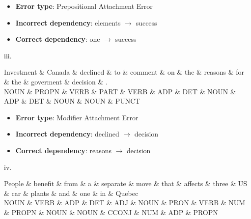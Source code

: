 \ifans{}
\begin{itemize}
    \item \textbf{Error type}: Prepositional Attachment Error
    \item \textbf{Incorrect dependency}: elements $\rightarrow$ success
    \item \textbf{Correct dependency}: one $\rightarrow$ success
\end{itemize}

\medskip

iii. \\
\begin{center}
 {\small

 \begin{dependency}[] 
 \begin{deptext}
Investment \& Canada \& declined \& to \& comment \& on \& the \& reasons \& for \& the \& goverment \& decision \& . \\
NOUN \& PROPN \& VERB \& PART \& VERB \& ADP \& DET \& NOUN \& ADP \& DET \& NOUN \& NOUN \& PUNCT \\
\end{deptext}
\end{dependency}

 }
 \end{center}

\ifans{}
\begin{itemize}
    \item \textbf{Error type}: Modifier Attachment Error
    \item \textbf{Incorrect dependency}: declined $\rightarrow$ decision
    \item \textbf{Correct dependency}: reasons $\rightarrow$ decision
\end{itemize}

iv. \\
 \begin{center}
 {\small
 \begin{dependency}[] 
 \begin{deptext}
People \& benefit \& from \& a \& separate \& move \& that \& affects \& three \& US \& car \& plants \& and \& one \& in \& Quebec \\
NOUN \& VERB \& ADP \& DET \& ADJ \& NOUN \& PRON \& VERB \& NUM \& PROPN \& NOUN \& NOUN \& CCONJ \& NUM \& ADP \& PROPN \\
\end{deptext}
\end{dependency}
 }
 \end{center}

